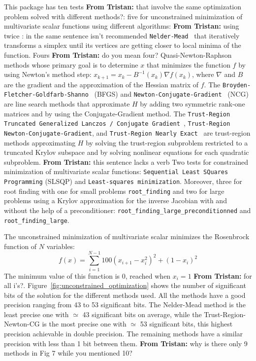 \documentclass[11pt]{article}
\newcommand{\tristan}[1]{\color{orange}\textbf{From Tristan:} #1\color{black}\xspace}
\begin{document}
This package has ten tests \tristan{that involve the same optimization problem solved with different methods?}: five for unconstrained minimization of multivariate scalar functions using different algorithms: \tristan{using twice : in the same sentence isn't recommended} \texttt{Nelder-Mead}~\cite{singer2009nelder} that iteratively transforms a simplex until its vertices are getting closer to local minima of the function. Fours \tristan{do you mean four?} Quasi-Newton-Raphson methods whose primary goal is to determine $x$ that minimizes the function $f$ by using Newton's method step: $x_{k+1} = x_{k} - B^{-1}(x_k)\nabla f(x_k)$, where $\nabla$ and $B$ are the gradient and the approximation of the Hessian matrix of $f$. The \texttt{Broyden-Fletcher-Goldfarb-Shanno}~\cite{BFGS} (BFGS) and \texttt{Newton-Conjugate-Gradient}~\cite{nocedal2006numerical} (NCG) are line search methods that approximate $H$ by adding two symmetric rank-one matrices and by using the Conjugate-Gradient method. The \texttt{Trust-Region Truncated Generalized Lanczos / Conjugate Gradient}~\cite{gould1999solving}, \texttt{Trust-Region Newton-Conjugate-Gradient}, and \texttt{Trust-Region Nearly Exact}~\cite{nocedal2006numerical} are trust-region methods approximating $H$ by solving the trust-region subproblem restricted to a truncated Krylov subspace and by solving nonlinear equations for each quadratic subproblem. \tristan{this sentence lacks a verb} Two tests for constrained minimization of multivariate scalar functions: \texttt{Sequential Least SQuares Programming} (SLSQP) and \texttt{Least-squares minimization}.
Moreover, three for root finding with one for small problems \texttt{root\_finding} and two for large problems using a Krylov approximation for the inverse Jacobian with and without the help of a preconditioner: \texttt{root\_finding\_large\_preconditionned} and \texttt{root\_finding\_large}.

The unconstrained minimization of multivariate scalar minimizes the Rosenbrock function of $N$ variables:
\[f(x) = \sum_{i=1}^{N-1} 100(x_{i+1}-x^2_i)^2 + (1-x_i)^2\]
The minimum value of this function is 0, reached when $x_i=1$ \tristan{for all i's?}.
Figure~\ref{fig:unconstrained_optimization} shows the number of significant bits of the solution for the different methods used. All the methods have a good precision ranging from 43 to 53 significant bits. The Nelder-Mead method is the least precise one with $\simeq$ 43 significant bits on average, while the Trust-Region-Newton-CG is the most precise one with $\simeq$ 53 significant bits, this highest precision achievable in double precision. The remaining methods have a similar precision with less than 1 bit between them. \tristan{why is there only 9 methods in Fig 7 while you mentioned 10?}
\end{document}
